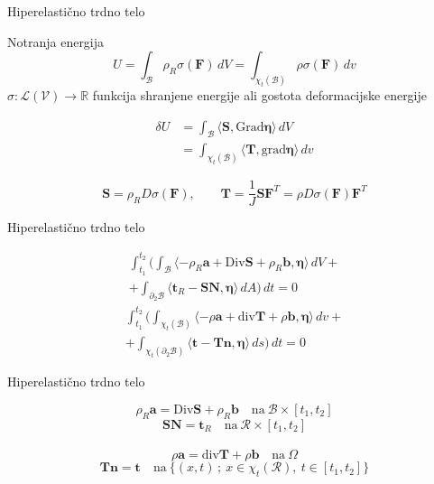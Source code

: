 \documentclass{beamer}
\newcommand{\R}{\mathbb R} %
\newcommand{\V}{\mathscr V} %
\renewcommand{\L}{\mathscr L} %
\newcommand{\B}{\mathcal B} %
\newcommand{\vek}[1]{\boldsymbol #1} %
\newcommand{\ten}[1]{\mathbf #1} %
\newcommand{\grad}{\mathrm{grad}} %
\renewcommand{\div}{\mathrm{div}} %
\newcommand{\Grad}{\mathrm{Grad}} %
\newcommand{\Div}{\mathrm {Div}} %
\begin{document}
\begin{frame}{Hiperelastično trdno telo}

\begin{block}{Notranja energija}
	\[ U=\int_{\B}\rho_R \sigma(\ten{F})\,dV=\int_{\chi_t(\B)}\rho\sigma(\ten{F})\,dv \]
	$\sigma\colon\L(\V)\to\R$ funkcija shranjene energije ali gostota deformacijske energije
\end{block}

\begin{align*} 
	\delta U &=\int_{\B}\langle\ten{S},\Grad\vek{\eta}\rangle\,dV \\
	&= \int_{\chi_t(\B)}\langle\ten{T},\grad\vek{\eta}\rangle\,dv
\end{align*}

\[ \ten{S}=\rho_RD\sigma(\ten{F}),\qquad \ten{T}=\frac{1}{J}\ten{S}\ten{F}^{T}=\rho D\sigma(\ten{F})\ten{F}^{T} \]

\end{frame}


\begin{frame}{Hiperelastično trdno telo}

\begin{multline*}
	\int_{t_1}^{t_2}\bigg( \int_{\B}\langle -\rho_R\vek{a}+
	\Div\ten{S}+\rho_R\vek{b},\vek{\eta}\rangle \,dV+ \\
	+\int_{\partial_2 \B}\langle\vek{t}_R-\ten{S}\vek{N},\vek{\eta}\rangle\,dA\bigg)\,dt=0
\end{multline*}
\begin{multline*}
	\int_{t_1}^{t_2}\bigg( \int_{\chi_t(\B)}\langle -\rho\vek{a}+
	\div\ten{T}+\rho\vek{b},\vek{\eta}\rangle\,dv+ \\
	+\int_{\chi_t(\partial_2 \B)}\langle\vek{t}-\ten{T}\vek{n},\vek{\eta}\rangle\,ds\bigg)\,dt=0
\end{multline*}

\end{frame}


\begin{frame}{Hiperelastično trdno telo}

\begin{equation*}
	\rho_R\vek{a}=\Div\ten{S}+\rho_R\vek{b}\quad\textrm{na}\ \B\times[t_1,t_2]
\end{equation*}
\begin{equation*}
	\ten{S}\vek{N}=\vek{t}_R\quad\textrm{na}\ \mathcal{R}\times[t_1,t_2]
\end{equation*}
\\
\begin{equation*}
	\rho\vek{a}=\div\ten{T}+\rho\vek{b}\quad\textrm{na}\ \Omega
\end{equation*}
\begin{equation*}
	\ten{T}\vek{n}=\vek{t}\quad\textrm{na}\ \{(x,t)\,;\ x\in\chi_t(\mathcal{R}),\ t\in[t_1,t_2] \}
\end{equation*}

\end{frame}
\end{document}
